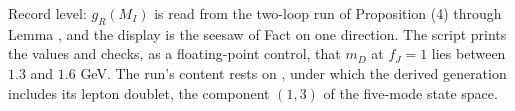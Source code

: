 Record level: $g_{R}(M_{I})$ is read from the two-loop run of Proposition (4) through Lemma , and the display is the seesaw of Fact  on one direction. The script prints the values and checks, as a floating-point control, that $m_{D}$ at $f_{J} = 1$ lies between $1.3$ and $1.6$ GeV. The run's content rests on , under which the derived generation includes its lepton doublet, the component $(1,3)$ of the five-mode state space.
